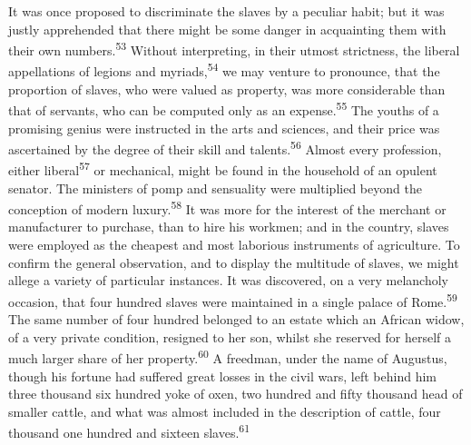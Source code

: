 It was once proposed to discriminate the slaves by a peculiar habit;
but it was justly apprehended that there might be some danger in
acquainting them with their own numbers.\textsuperscript{53} Without interpreting,
in their utmost strictness, the liberal appellations of legions
and myriads,\textsuperscript{54} we may venture to pronounce, that the proportion
of slaves, who were valued as property, was more considerable
than that of servants, who can be computed only as an expense.\textsuperscript{55}
The youths of a promising genius were instructed in the arts and
sciences, and their price was ascertained by the degree of their
skill and talents.\textsuperscript{56} Almost every profession, either liberal\textsuperscript{57}
or mechanical, might be found in the household of an opulent
senator. The ministers of pomp and sensuality were multiplied
beyond the conception of modern luxury.\textsuperscript{58} It was more for the
interest of the merchant or manufacturer to purchase, than to
hire his workmen; and in the country, slaves were employed as the
cheapest and most laborious instruments of agriculture. To
confirm the general observation, and to display the multitude of
slaves, we might allege a variety of particular instances. It was
discovered, on a very melancholy occasion, that four hundred
slaves were maintained in a single palace of Rome.\textsuperscript{59} The same
number of four hundred belonged to an estate which an African
widow, of a very private condition, resigned to her son, whilst
she reserved for herself a much larger share of her property.\textsuperscript{60}
A freedman, under the name of Augustus, though his fortune had
suffered great losses in the civil wars, left behind him three
thousand six hundred yoke of oxen, two hundred and fifty thousand
head of smaller cattle, and what was almost included in the
description of cattle, four thousand one hundred and sixteen
slaves.\textsuperscript{61}




